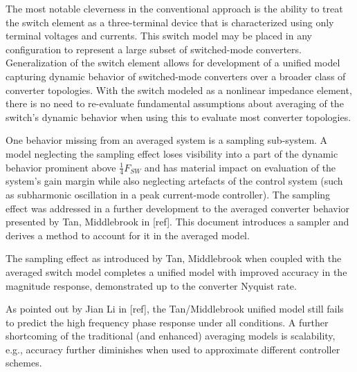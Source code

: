 \documentclass[conference]{IEEEtran}
\begin{document}
The most notable cleverness in the conventional approach is the ability to treat the switch element as a three-terminal device that is characterized using only terminal voltages and currents. This switch model may be placed in any configuration to represent a large subset of switched-mode converters.  Generalization of the switch element allows for development of a unified model capturing dynamic behavior of switched-mode converters over a broader class of converter topologies. With the switch modeled as a nonlinear impedance element, there is no need to re-evaluate fundamental assumptions about averaging of the switch's dynamic behavior when using this to evaluate most converter topologies.

One behavior missing from an averaged system is a sampling sub-system.  A model neglecting the sampling effect loses visibility into a part of the dynamic behavior prominent above $\frac{1}{4} F_{SW}$ and has material impact on evaluation of the system's gain margin while also neglecting artefacts of the control system (such as subharmonic oscillation in a peak current-mode controller). The sampling effect was addressed in a further development to the averaged converter behavior presented by Tan, Middlebrook in [ref]. This document introduces a sampler and derives a method to account for it in the averaged model.

The sampling effect as introduced by Tan, Middlebrook when coupled with the averaged switch model completes a unified model with improved accuracy in the magnitude response, demonstrated up to the converter Nyquist rate. 

As pointed out by Jian Li in [ref], the Tan/Middlebrook unified model still fails to predict the high frequency phase response under all conditions.  A further shortcoming of the traditional (and enhanced) averaging models is scalability, e.g., accuracy further diminishes when used to approximate different controller schemes.
\end{document}
